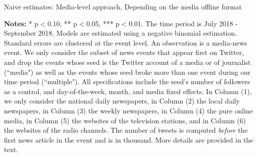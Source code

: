 \begin{table}
\caption{Naive estimates: Media-level approach, Depending on the media offline format}
\begin{center}
	
\end{center}
\begin{spacing}{0.5}
	{\fns \textbf{Notes:} * p$<$0.10, ** p$<$0.05, *** p$<$0.01. The time period is July 2018 - September 2018.  Models are estimated using a negative binomial estimation. Standard errors are clustered at the event level. An observation is a media-news event. We only consider the subset of news events that appear first on Twitter, and drop the events whose seed is the Twitter account of a media or of journalist (``media") as well as the events whose seed broke more than one event during our time period (``multiple"). All specifications include the seed's number of followers as a control, and day-of-the-week, month, and media fixed effects. In Column (1), we only consider the national daily newspapers, in Column (2) the local daily newspapers, in Column (3) the weekly newspapers, in Column (4) the pure online media, in Column (5) the websites of the television stations, and in Column (6) the websites of the radio channels. The number of tweets is computed \textit{before} the first news article in the event and is in thousand. More details are provided in the text.} 
\end{spacing}
\label{Tab:number_articles_negbinomial_cevent_heterogeneity}
\end{table} 


%	


